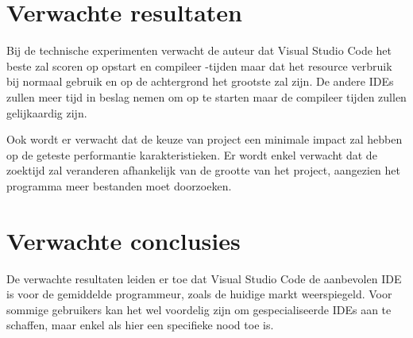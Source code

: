 \section{Verwachte resultaten}
\label{sec:verwachte_resultaten}

Bij de technische experimenten verwacht de auteur dat Visual Studio Code het beste zal scoren op opstart en compileer -tijden maar dat het resource verbruik bij normaal gebruik en op de achtergrond het grootste zal zijn. De andere IDEs zullen meer tijd in beslag nemen om op te starten maar de compileer tijden zullen gelijkaardig zijn.

Ook wordt er verwacht dat de keuze van project een minimale impact zal hebben op de geteste performantie karakteristieken. Er wordt enkel verwacht dat de zoektijd zal veranderen afhankelijk van de grootte van het project, aangezien het programma meer bestanden moet doorzoeken.

\section{Verwachte conclusies}
\label{sec:verwachte_conclusies}

De verwachte resultaten leiden er toe dat Visual Studio Code de aanbevolen IDE is voor de gemiddelde programmeur, zoals de huidige markt weerspiegeld. Voor sommige gebruikers kan het wel voordelig zijn om gespecialiseerde IDEs aan te schaffen, maar enkel als hier een specifieke nood toe is.

